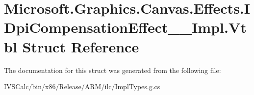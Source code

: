 \hypertarget{struct_microsoft_1_1_graphics_1_1_canvas_1_1_effects_1_1_i_dpi_compensation_effect_____impl_1_1_vtbl}{}\section{Microsoft.\+Graphics.\+Canvas.\+Effects.\+I\+Dpi\+Compensation\+Effect\+\_\+\+\_\+\+Impl.\+Vtbl Struct Reference}
\label{struct_microsoft_1_1_graphics_1_1_canvas_1_1_effects_1_1_i_dpi_compensation_effect_____impl_1_1_vtbl}


The documentation for this struct was generated from the following file\+:\begin{DoxyCompactItemize}
\item 
I\+V\+S\+Calc/bin/x86/\+Release/\+A\+R\+M/ilc/Impl\+Types.\+g.\+cs\end{DoxyCompactItemize}
